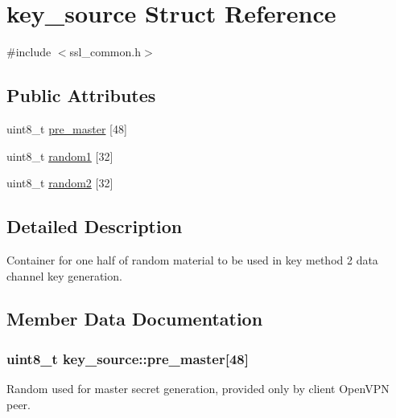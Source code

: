 \hypertarget{structkey__source}{}\section{key\+\_\+source Struct Reference}
\label{structkey__source}


{\ttfamily \#include $<$ssl\+\_\+common.\+h$>$}

\subsection*{Public Attributes}
\begin{DoxyCompactItemize}
\item 
uint8\+\_\+t \hyperlink{structkey__source_a82d38ddf3045b9abd531a07c024464b6}{pre\+\_\+master} \mbox{[}48\mbox{]}
\item 
uint8\+\_\+t \hyperlink{structkey__source_a2c31011a183ba65651390e5bfbda3032}{random1} \mbox{[}32\mbox{]}
\item 
uint8\+\_\+t \hyperlink{structkey__source_a88a904e92bfac5a03da3f5e0b7f12124}{random2} \mbox{[}32\mbox{]}
\end{DoxyCompactItemize}


\subsection{Detailed Description}
Container for one half of random material to be used in key method 2 data channel key generation. 

\subsection{Member Data Documentation}
\hypertarget{structkey__source_a82d38ddf3045b9abd531a07c024464b6}{}
\subsubsection[{pre\+\_\+master}]{\setlength{\rightskip}{0pt plus 5cm}uint8\+\_\+t key\+\_\+source\+::pre\+\_\+master\mbox{[}48\mbox{]}}\label{structkey__source_a82d38ddf3045b9abd531a07c024464b6}
Random used for master secret generation, provided only by client Open\+V\+P\+N peer. \hypertarget{structkey__source_a2c31011a183ba65651390e5bfbda3032}{}
